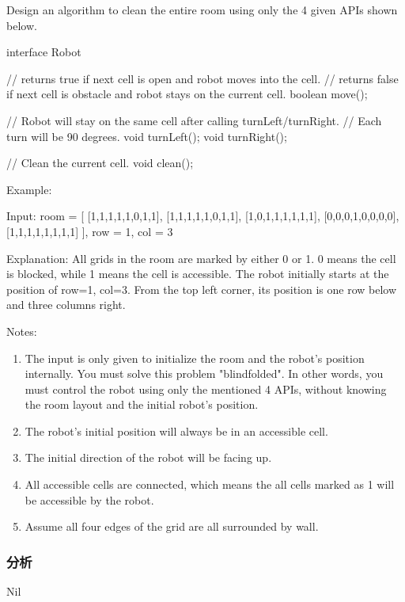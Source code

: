 Design an algorithm to clean the entire room using only the 4 given APIs shown below.

\begin{Code}
interface Robot {
  // returns true if next cell is open and robot moves into the cell.
  // returns false if next cell is obstacle and robot stays on the current cell.
  boolean move();

  // Robot will stay on the same cell after calling turnLeft/turnRight.
  // Each turn will be 90 degrees.
  void turnLeft();
  void turnRight();

  // Clean the current cell.
  void clean();
}
\end{Code}

Example:
\begin{Code}
Input:
room = [
  [1,1,1,1,1,0,1,1],
  [1,1,1,1,1,0,1,1],
  [1,0,1,1,1,1,1,1],
  [0,0,0,1,0,0,0,0],
  [1,1,1,1,1,1,1,1]
],
row = 1,
col = 3

Explanation:
All grids in the room are marked by either 0 or 1.
0 means the cell is blocked, while 1 means the cell is accessible.
The robot initially starts at the position of row=1, col=3.
From the top left corner, its position is one row below and three columns right.
\end{Code}

Notes:

\begin{enumerate}
\item The input is only given to initialize the room and the robot's position internally. You must solve this problem "blindfolded". In other words, you must control the robot using only the mentioned 4 APIs, without knowing the room layout and the initial robot's position.
\item The robot's initial position will always be in an accessible cell.
\item The initial direction of the robot will be facing up.
\item All accessible cells are connected, which means the all cells marked as 1 will be accessible by the robot.
\item Assume all four edges of the grid are all surrounded by wall.
\end{enumerate}

\subsubsection{分析}
Nil

